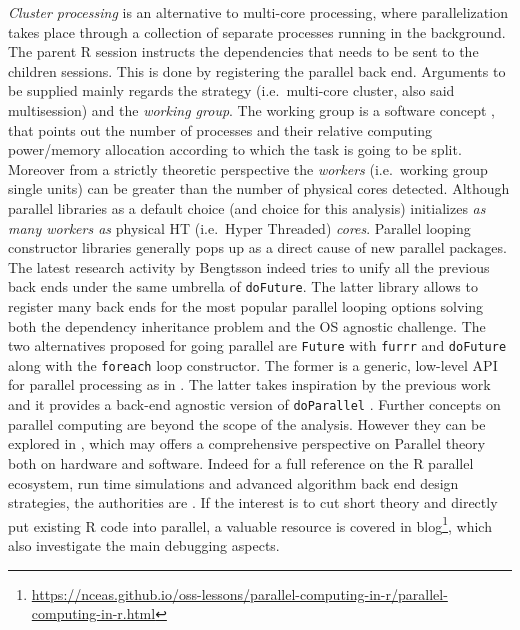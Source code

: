 \documentclass[
  12pt,
  a4paper,
  oneside]{book}
\newcommand{\passthrough}[1]{#1}
\DeclareRobustCommand{\href}[2]{#2\footnote{\url{#1}}}
\theoremstyle{definition}
\theoremstyle{definition}
\theoremstyle{definition}
\theoremstyle{remark}
\begin{document}
\emph{Cluster processing} is an alternative to multi-core processing, where parallelization takes place through a collection of separate processes running in the background. The parent R session instructs the dependencies that needs to be sent to the children sessions.
This is done by registering the parallel back end. Arguments to be supplied mainly regards the strategy (i.e.~multi-core cluster, also said multisession) and the \emph{working group}. The working group is a software concept \citep{parallelr}, that points out the number of processes and their relative computing power/memory allocation according to which the task is going to be split. Moreover from a strictly theoretic perspective the \emph{workers} (i.e.~working group single units) can be greater than the number of physical cores detected. Although parallel libraries as a default choice (and choice for this analysis) initializes \emph{as many workers as} physical HT (i.e.~Hyper Threaded) \emph{cores}.
Parallel looping constructor libraries generally pops up as a direct cause of new parallel packages. The latest research activity by Bengtsson \citet{doFuture} indeed tries to unify all the previous back ends under the same umbrella of \passthrough{\lstinline!doFuture!}. The latter library allows to register many back ends for the most popular parallel looping options solving both the dependency inheritance problem and the OS agnostic challenge.
The two alternatives proposed for going parallel are \passthrough{\lstinline!Future!} \citet{future} with \passthrough{\lstinline!furrr!} \citet{furrr} and \passthrough{\lstinline!doFuture!} \citeyearpar{doFuture} along with the \passthrough{\lstinline!foreach!} \citet{foreach} loop constructor. The former is a generic, low-level API for parallel processing as in \citet{bengtsson_2017}. The latter takes inspiration by the previous work and it provides a back-end agnostic version of \passthrough{\lstinline!doParallel!} \citet{doParallel}.
Further concepts on parallel computing are beyond the scope of the analysis. However they can be explored in \citet{barney}, which may offers a comprehensive perspective on Parallel theory both on hardware and software. Indeed for a full reference on the R parallel ecosystem, run time simulations and advanced algorithm back end design strategies, the authorities are \citet{parallelr}. If the interest is to cut short theory and directly put existing R code into parallel, a valuable resource is covered in \href{https://nceas.github.io/oss-lessons/parallel-computing-in-r/parallel-computing-in-r.html}{blog}, which also investigate the main debugging aspects.
\end{document}
